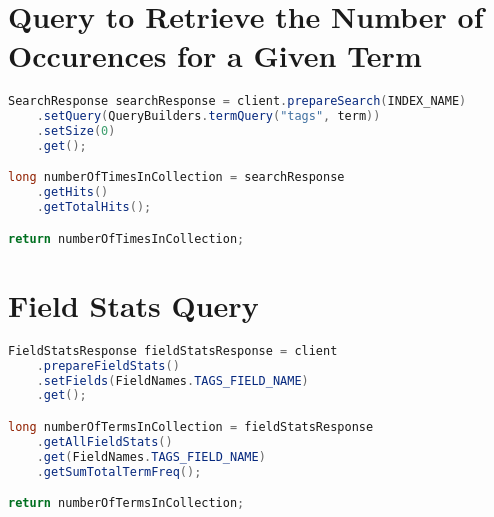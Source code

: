 \section{Query to Retrieve the Number of Occurences for a Given Term}
\begin{lstlisting}[language={java}, caption={Java code used retrieve the number of occurences for a given term in the collection.}, label={ap:number-of-occurences-query}]
SearchResponse searchResponse = client.prepareSearch(INDEX_NAME)
    .setQuery(QueryBuilders.termQuery("tags", term))
    .setSize(0)
    .get();

long numberOfTimesInCollection = searchResponse
    .getHits()
    .getTotalHits();

return numberOfTimesInCollection;
\end{lstlisting}

\section{Field Stats Query}
\begin{lstlisting}[language={java}, caption={Java code used retrieve the total number of terms in a field in the collection.}, label={ap:field-stasts-query}]
FieldStatsResponse fieldStatsResponse = client
    .prepareFieldStats()
    .setFields(FieldNames.TAGS_FIELD_NAME)
    .get();

long numberOfTermsInCollection = fieldStatsResponse
    .getAllFieldStats()
    .get(FieldNames.TAGS_FIELD_NAME)
    .getSumTotalTermFreq();

return numberOfTermsInCollection;
\end{lstlisting}
